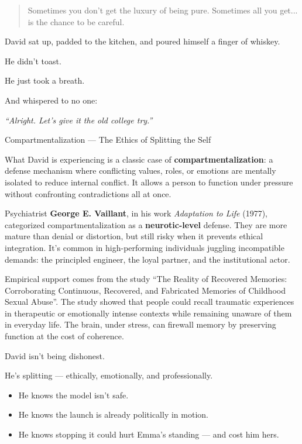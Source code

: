 \begin{quote}
  Sometimes you don’t get the luxury of being pure.  
  Sometimes all you get... is the chance to be careful.
\end{quote}

David sat up, padded to the kitchen, and poured himself a finger of whiskey.

He didn’t toast.

He just took a breath.

And whispered to no one:

\textit{``Alright. Let’s give it the old college try.''}

\medskip

\begin{PsychologicalSidebar}{Compartmentalization --- The Ethics of Splitting the Self}

What David is experiencing is a classic case of \textbf{compartmentalization}: a defense mechanism 
where conflicting values, roles, or emotions are mentally isolated to reduce internal conflict. It 
allows a person to function under pressure without confronting contradictions all at once.

\medskip

Psychiatrist \textbf{George E. Vaillant}, in his work \textit{Adaptation to Life} (1977), categorized 
compartmentalization as a \textbf{neurotic-level} defense. They are more mature than denial or distortion, 
but still risky when it prevents ethical integration. It's common in 
high-performing individuals juggling incompatible demands: the principled engineer, the loyal partner, 
and the institutional actor.

\medskip

Empirical support comes from the study “The Reality of Recovered Memories: Corroborating Continuous, 
Recovered, and Fabricated Memories of Childhood Sexual Abuse”. The study showed that people could 
recall traumatic experiences in therapeutic or emotionally intense contexts while remaining unaware 
of them in everyday life. The brain, under stress, can firewall memory by preserving function at 
the cost of coherence.

\medskip

David isn't being dishonest.

\medskip

He's splitting — ethically, emotionally, and professionally.

\medskip

    \begin{itemize}
        \item He knows the model isn’t safe.
        \item He knows the launch is already politically in motion.
        \item He knows stopping it could hurt Emma’s standing — and cost him hers.
    \end{itemize}


\end{PsychologicalSidebar}
